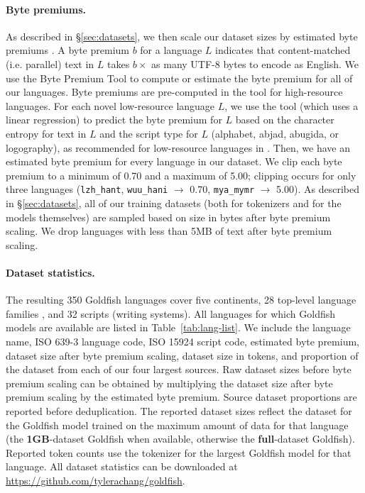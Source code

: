 \documentclass[11pt]{article}
\begin{document}
\paragraph{Byte premiums.}
As described in \S\ref{sec:datasets}, we then scale our dataset sizes by estimated byte premiums \citep{arnett2024bit}.
A byte premium $b$ for a language $L$ indicates that content-matched (i.e. parallel) text in $L$ takes $b\times$ as many UTF-8 bytes to encode as English.
We use the Byte Premium Tool \citep{arnett2024bit} to compute or estimate the byte premium for all of our languages.
Byte premiums are pre-computed in the tool for high-resource languages.
For each novel low-resource language $L$, we use the tool (which uses a linear regression) to predict the byte premium for $L$ based on the character entropy for text in $L$ and the script type for $L$ (alphabet, abjad, abugida, or logography), as recommended for low-resource languages in \citet{arnett2024bit}.
Then, we have an estimated byte premium for every language in our dataset.
We clip each byte premium to a minimum of 0.70 and a maximum of 5.00; clipping occurs for only three languages (\texttt{lzh\_hant}, \texttt{wuu\_hani} $\to$ 0.70, \texttt{mya\_mymr} $\to$ 5.00).
As described in \S\ref{sec:datasets}, all of our training datasets (both for tokenizers and for the models themselves) are sampled based on size in bytes after byte premium scaling.
We drop languages with less than 5MB of text after byte premium scaling.

\paragraph{Dataset statistics.}
The resulting 350 Goldfish languages cover five continents, 28 top-level language families \citep{hammarstrom-etal-2021-glottolog}, and 32 scripts (writing systems).
All languages for which Goldfish models are available are listed in Table~\ref{tab:lang-list}.
We include the language name, ISO 639-3 language code, ISO 15924 script code, estimated byte premium, dataset size after byte premium scaling, dataset size in tokens, and proportion of the dataset from each of our four largest sources.
Raw dataset sizes before byte premium scaling can be obtained by multiplying the dataset size after byte premium scaling by the estimated byte premium.
Source dataset proportions are reported before deduplication.
The reported dataset sizes reflect the dataset for the Goldfish model trained on the maximum amount of data for that language (the \textbf{1GB}-dataset Goldfish when available, otherwise the \textbf{full}-dataset Goldfish).
Reported token counts use the tokenizer for the largest Goldfish model for that language.
All dataset statistics can be downloaded at \url{https://github.com/tylerachang/goldfish}.
\end{document}
